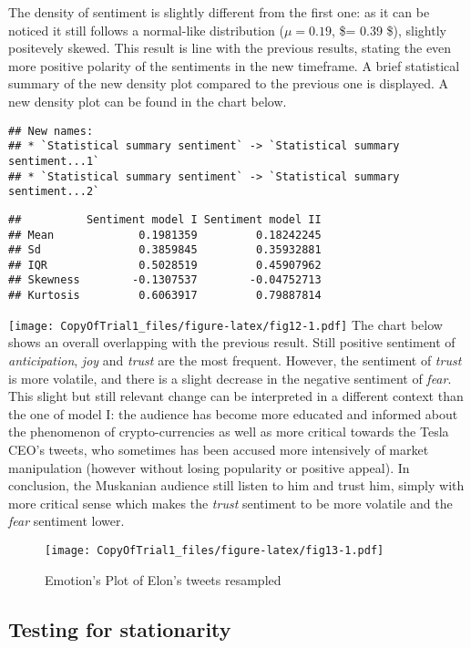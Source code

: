 \documentclass[
]{article}
\begin{document}
The density of sentiment is slightly different from the first one: as it
can be noticed it still follows a normal-like distribution
(\(\mu = 0.19\), \$\sigma = 0.39 \$), slightly positevely skewed. This
result is line with the previous results, stating the even more positive
polarity of the sentiments in the new timeframe. A brief statistical
summary of the new density plot compared to the previous one is
displayed. A new density plot can be found in the chart below.

\begin{verbatim}
## New names:
## * `Statistical summary sentiment` -> `Statistical summary sentiment...1`
## * `Statistical summary sentiment` -> `Statistical summary sentiment...2`
\end{verbatim}

\begin{verbatim}
##          Sentiment model I Sentiment model II
## Mean             0.1981359         0.18242245
## Sd               0.3859845         0.35932881
## IQR              0.5028519         0.45907962
## Skewness        -0.1307537        -0.04752713
## Kurtosis         0.6063917         0.79887814
\end{verbatim}

\texttt{[image: CopyOfTrial1\_files/figure-latex/fig12-1.pdf]} The chart
below shows an overall overlapping with the previous result. Still
positive sentiment of \emph{anticipation}, \emph{joy} and \emph{trust}
are the most frequent. However, the sentiment of \emph{trust} is more
volatile, and there is a slight decrease in the negative sentiment of
\emph{fear}. This slight but still relevant change can be interpreted in
a different context than the one of model I: the audience has become
more educated and informed about the phenomenon of crypto-currencies as
well as more critical towards the Tesla CEO's tweets, who sometimes has
been accused more intensively of market manipulation (however without
losing popularity or positive appeal). In conclusion, the Muskanian
audience still listen to him and trust him, simply with more critical
sense which makes the \emph{trust} sentiment to be more volatile and the
\emph{fear} sentiment lower.

\begin{figure}
\centering
\texttt{[image: CopyOfTrial1\_files/figure-latex/fig13-1.pdf]}
\caption{\label{fig:fig13}Emotion's Plot of Elon's tweets resampled}
\end{figure}

\hypertarget{testing-for-stationarity-1}{%
\subsection{Testing for stationarity}\label{testing-for-stationarity-1}}
\end{document}
